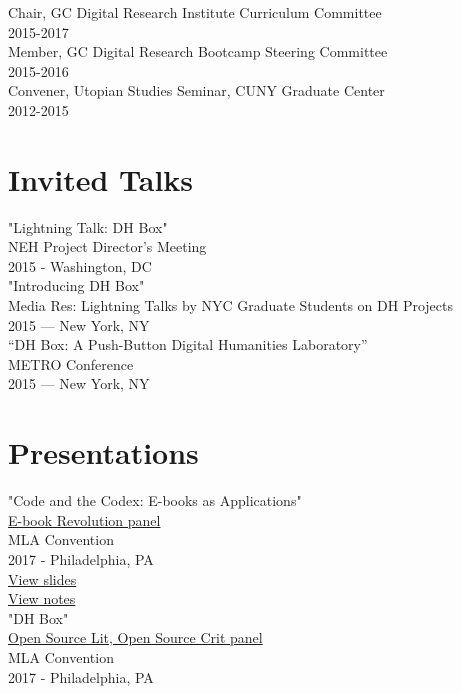 \documentclass[11pt]{article}
\begin{document}
Chair, GC Digital Research Institute Curriculum Committee\\
2015-2017\\

Member, GC Digital Research Bootcamp Steering Committee\\
2015-2016\\

Convener, Utopian Studies Seminar, CUNY Graduate Center\\
2012-2015\\

\section*{Invited Talks}
\label{sec:orgheadline6}
"Lightning Talk: DH Box"\\
NEH Project Director's Meeting\\
2015 - Washington, DC\\

"Introducing DH Box"\\
Media Res: Lightning Talks by NYC Graduate Students on DH Projects\\
2015 — New York, NY\\

“DH Box: A Push-Button Digital Humanities Laboratory”\\
METRO Conference\\
2015 — New York, NY\\

\section*{Presentations}
\label{sec:orgheadline7}
"Code and the Codex: E-books as Applications"\\
\href{https://apps.mla.org/program_details?prog_id=75&year=2017}{E-book Revolution panel}\\
MLA Convention\\
2017 - Philadelphia, PA\\
\href{http://htmlpreview.github.io/?https://github.com/smythp/ebooks-as-applications/blob/master/presentation.html#/sec-title-slide}{View slides}\\
\href{https://github.com/smythp/ebooks-as-applications#ebooks-as-applications}{View notes}\\

"DH Box"\\
\href{https://text.mla.hcommons.org/}{Open Source Lit, Open Source Crit panel}\\
MLA Convention\\
2017 - Philadelphia, PA\\
\end{document}

